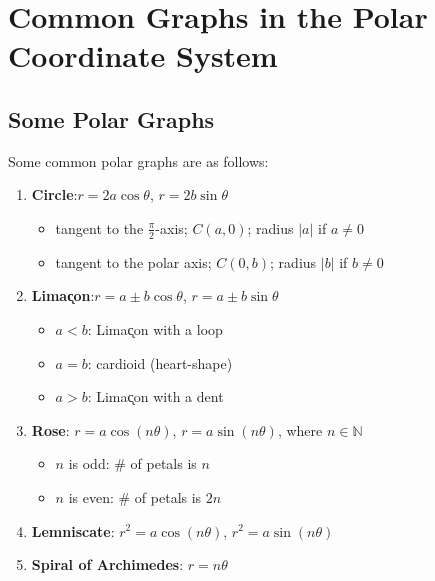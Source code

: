 \documentclass[12pt,twoside]{article}
\begin{document}








\section{Common Graphs in the Polar Coordinate System}

\subsection{Some Polar Graphs}

Some common polar graphs are as follows:
\begin{enumerate}
\item {\color{red}\bf Circle}:\quad $r=2a\cos\theta$, $r=2b\sin\theta$
\begin{itemize}
\item tangent to the $\frac{\pi}{2}$-axis; $C(a,0)$; radius $|a|$ if $a\neq 0$
\item tangent to the polar axis; $C(0,b)$; radius $|b|$ if $b\neq 0$
\end{itemize}
\item {\color{red}\bf Lima\k{c}on}:\quad $r=a\pm b\cos\theta$, $r=a\pm b\sin\theta$
\begin{itemize}
\item $a<b$: Lima\k{c}on with a loop
\item $a=b$: cardioid (heart-shape)
\item $a>b$: Lima\k{c}on with a dent
\end{itemize}
\item {\color{red}\bf Rose}: \quad $r=a\cos(n\theta)$, $r=a\sin(n\theta)$, where $n\in\mathbb{N}$
\begin{itemize}
\item $n$ is odd: $\#$ of petals is $n$ 
\item $n$ is even: $\#$ of petals is $2n$ 
\end{itemize}
\item {\color{red}\bf Lemniscate}: \quad $r^2=a\cos(n\theta)$, $r^2=a\sin(n\theta)$
\item {\color{red}\bf Spiral of Archimedes}: \quad $r=n\theta$
\end{enumerate}
\end{document}
